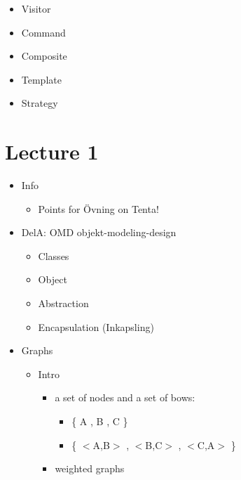 \documentclass[11pt]{amsart}
\begin{document}
\begin{itemize}
\item Visitor
\item Command
\item Composite
\item Template
\item Strategy
\end{itemize}



\section{Lecture 1}
\begin{itemize}
\item Info
	\begin{itemize}
	\item Points for \"{O}vning on Tenta!
	\end{itemize}
\item DelA: OMD objekt-modeling-design
	\begin{itemize}
	\item Classes
	\item Object
	\item Abstraction
	\item Encapsulation (Inkapsling)
	\end{itemize}
\item Graphs
	\begin{itemize}
	\item Intro
		\begin{itemize}
		\item a set of nodes and a set of bows: 
			\begin{itemize}
			\item \{ A , B , C \}
			\item \{ $<$A,B$>$ , $<$B,C$>$ , $<$C,A$>$ \}
			\end{itemize}
		\item weighted graphs
		\end{itemize}
	

\end{itemize}
\end{itemize}
\end{document}
